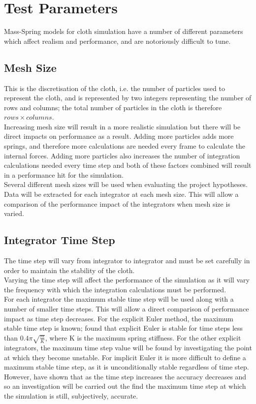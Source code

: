 \section{Test Parameters}
Mass-Spring models for cloth simulation have a number of different parameters which affect realism and performance, and are notoriously difficult to tune.

\subsection{Mesh Size}
This is the discretisation of the cloth, i.e. the number of particles used to represent the cloth, and is represented by two integers representing the number of rows and columns; the total number of particles in the cloth is therefore $rows \times columns$.
\\Increasing mesh size will result in a more realistic simulation but there will be direct impacts on performance as a result. Adding more particles adds more springs, and therefore more calculations are needed every frame to calculate the internal forces. Adding more particles also increases the number of integration calculations needed every time step and both of these factors combined will result in a performance hit for the simulation.
\\Several different mesh sizes will be used when evaluating the project hypotheses. Data will be extracted for each integrator at each mesh size. This will allow a comparison of the performance impact of the integrators when mesh size is varied.

\subsection{Integrator Time Step}
The time step will vary from integrator to integrator and must be set carefully in order to maintain the stability of the cloth.
\\Varying the time step will affect the performance of the simulation as it will vary the frequency with which the integration calculations must be performed.
\\For each integrator the maximum stable time step will be used along with a number of smaller time steps. This will allow a direct comparison of performance impact as time step decreases. For the explicit Euler method, the maximum stable time step is known; \textcite[2]{Vassilev2001} found that explicit Euler is stable for time steps less than $0.4\pi\sqrt{\frac{m}{K}}$, where K is the maximum spring stiffness. For the other explicit integrators, the maximum time step value will be found by investigating the point at which they become unstable. For implicit Euler it is more difficult to define a maximum stable time step, as it is unconditionally stable regardless of time step. However, \textcite{Volino2001} have shown that as the time step increases the accuracy decreases and so an investigation will be carried out the find the maximum time step at which the simulation is still, subjectively, accurate.


